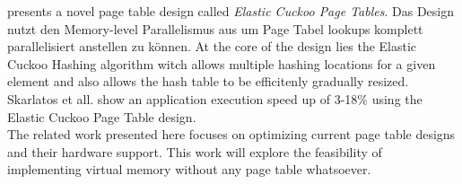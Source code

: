 
\textbf{\cite{skarlatos2020elastic}} presents a novel page table design called \textit{Elastic Cuckoo Page
    Tables}. Das Design nutzt den Memory-level Parallelismus aus um Page Tabel lookups komplett parallelisiert
anstellen zu können. At the core of the design lies the Elastic Cuckoo Hashing algorithm witch allows
multiple hashing locations for a given element and also allows the hash table to be efficitenly gradually
resized. Skarlatos et all. show an application execution speed up of 3-18\% using the Elastic Cuckoo
Page Table design.\\



The related work presented here focuses on optimizing current page table designs and their hardware
support. This work will explore the feasibility of implementing virtual memory without any page table
whatsoever. %


\cite{zagieboylo2020cost}